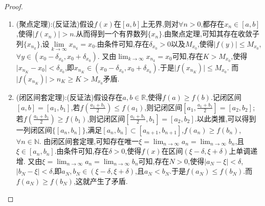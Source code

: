 \documentclass[../../main.tex]{subfiles}%
\begin{document}
\begin{proof}
\begin{enumerate}
{\color{blue}证法三(闭区间套定理):}(反证法)假设存在$a,b\in \mathbb{R}$,使得$f(a)\ne f(b)$.不妨设\(f(a) < f(b)\),则记闭区间\([a,b]=[a_1,b_1]\).若\(f(\frac{a_1 + b_1}{2}) > f(a_1)\),则记闭区间\([a_1,\frac{a_1 + b_1}{2}]=[a_2,b_2]\);若\(f(\frac{a_1 + b_1}{2}) < f(b_1)\),则记闭区间\([\frac{a_1 + b_1}{2},b_1]=[a_2,b_2]\).以此类推,可以得到一列闭区间\(\{[a_n,b_n]\}\),满足\([a_n,b_n]\subset [a_{n + 1},b_{n + 1}]\),\(f(a_n) < f(b_n)\),\(\forall n\in\mathbb{N}\).由闭区间套定理,可知存在唯一\(\xi=\lim_{n\rightarrow\infty}a_n=\lim_{n\rightarrow\infty}b_n\),且\(\xi\in [a_n,b_n]\).又由条件可知,存在\(r > 0\),使得\(f(t)=f(\xi)\),\(\forall t\in (\xi - r,\xi + r)\).从而存在充分大的\(N\in\mathbb{N}\),使得\(\vert a_N - \xi\vert < r\),\(\vert b_N - \xi\vert < r\),即\(a_N,b_N\in (\xi - r,\xi + r)\).于是\(f(a_N)=f(b_N)\),这与\(f(a_N) < f(b_N)\)矛盾.

\item {\color{blue}(聚点定理):}(反证法)假设$f(x)$在$[a,b]$上无界,则对$\forall n>0$,都存在$x_n\in[a,b]$,使得$\left| f\left( x_n \right) \right|>n$.从而得到一个有界数列$\{x_n\}$.由聚点定理,可知其存在收敛子列$\{x_{n_k}\}$,设$\underset{k\rightarrow \infty}{\lim}x_{n_k}=x_0$.由条件可知,存在\(\delta _{x_0}>0\)以及\(M_{x_0}\),使得\(\vert f(y)\vert\leqslant M_{x_0}\),\(\forall y\in(x_0 - \delta _{x_0},x_0+\delta _{x_0})\).
又由\(\lim_{k\rightarrow\infty}x_{n_k}=x_0\)可知,存在\(K > M_{x_0}\),使得\(\vert x_{n_K}-x_0\vert<\delta _{x_0}\),即\(x_{n_K}\in(x_0 - \delta _{x_0},x_0+\delta _{x_0})\).于是\(\vert f(x_{n_K})\vert\leqslant M_{x_0}\).
而\(\vert f(x_{n_K})\vert>n_K\geqslant K > M_{x_0}\)矛盾.

\item {\color{blue}(闭区间套定理):}(反证法)假设存在$a,b\in \mathbb{R}$,使得$f(a)\geqslant  f(b)$.记闭区间\([a,b]=[a_1,b_1]\),若\(f\left(\frac{a_1 + b_1}{2}\right) \leqslant f\left(a_1\right)\),则记闭区间\(\left[a_1,\frac{a_1 + b_1}{2}\right]=[a_2,b_2]\);若\(f\left(\frac{a_1 + b_1}{2}\right) \geqslant f\left(b_1\right)\),则记闭区间\(\left[\frac{a_1 + b_1}{2},b_1\right]=[a_2,b_2]\).以此类推,可以得到一列闭区间\(\{[a_n,b_n]\}\),满足\([a_n,b_n]\subset [a_{n + 1},b_{n + 1}]\),\(f(a_n)\geqslant f(b_n)\),\(\forall n\in \mathbb{N}\).
由闭区间套定理,可知存在唯一\(\xi = \lim_{n\rightarrow \infty} a_n = \lim_{n\rightarrow \infty} b_n\),且\(\xi \in [a_n,b_n]\).由条件可知,存在\(\delta > 0\),使得\(f\left(x\right)\)在区间\(\left(\xi - \delta,\xi + \delta\right)\)上单调递增.
又由\(\xi = \lim_{n\rightarrow \infty} a_n = \lim_{n\rightarrow \infty} b_n\)可知,存在\(N > 0\),使得\(\left|a_N - \xi\right| < \delta\),\(\left|b_N - \xi\right| < \delta\),即\(a_N,b_N\in \left(\xi - \delta,\xi + \delta\right)\),且\(a_N < b_N\).于是\(f\left(a_N\right) \leqslant f\left(b_N\right)\).而\(f\left(a_N\right) \geqslant f\left(b_N\right)\),这就产生了矛盾.
\end{enumerate}

\end{proof}
\end{document}
